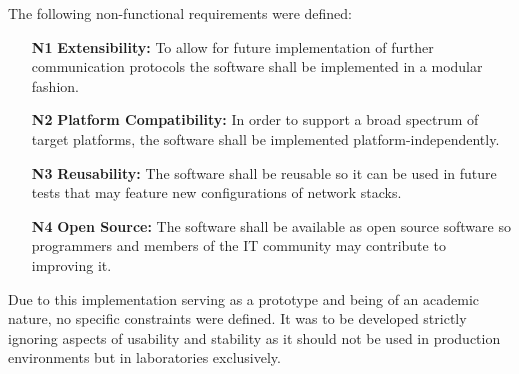 The following non-functional requirements were defined:

\begin{itemize}
    \item [\textbf{N1}] \textbf{Extensibility:} To allow for future implementation of further communication protocols the software shall be implemented in a modular fashion.
    \item [\textbf{N2}] \textbf{Platform Compatibility:} In order to support a broad spectrum of target platforms, the software shall be implemented platform-independently.
    \item [\textbf{N3}] \textbf{Reusability:} The software shall be reusable so it can be used in future tests that may feature new configurations of network stacks.
    \item [\textbf{N4}] \textbf{Open Source:} The software shall be available as open source software so programmers and members of the IT community may contribute to improving it.
\end{itemize}

Due to this implementation serving as a prototype and being of an academic nature, no specific constraints were defined. It was to be developed strictly ignoring aspects of usability and stability as it should not be used in production environments but in laboratories exclusively.

